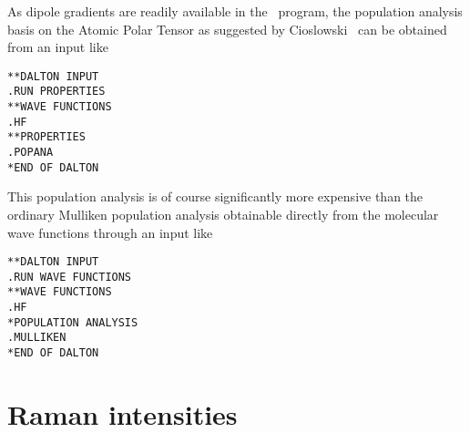 \begin{center}
\end{center}

 As dipole gradients are readily available in the
\dalton\ program, the
population analysis basis on the Atomic Polar Tensor as suggested by
Cioslowski~\cite{jcjacs111,poakrkvmthjpca102} can be obtained from an input like

\begin{verbatim}
**DALTON INPUT
.RUN PROPERTIES
**WAVE FUNCTIONS
.HF
**PROPERTIES
.POPANA
*END OF DALTON
\end{verbatim}

This population analysis is of course significantly more expensive
than the ordinary Mulliken population analysis obtainable directly
from the molecular wave functions through an input like

\begin{verbatim}
**DALTON INPUT
.RUN WAVE FUNCTIONS
**WAVE FUNCTIONS
.HF
*POPULATION ANALYSIS
.MULLIKEN
*END OF DALTON
\end{verbatim}


\section{Raman intensities}\label{sec:ramanint}

\begin{center}
\end{center}

